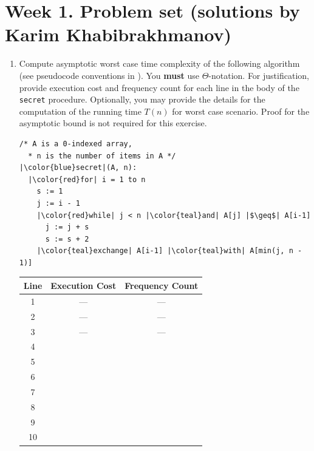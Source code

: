 \documentclass[dvipsnames]{article}
\begin{document}
\section*{Week 1. Problem set (solutions by Karim Khabibrakhmanov)}

\thispagestyle{fancy}

\begin{enumerate}
  \item
    Compute asymptotic worst case time complexity of the following algorithm (see pseudocode conventions in \cite[\S 2.1]{Cormen2022}).
    You \textbf{must} use $\Theta$-notation.
    For justification, provide execution cost and frequency count for each line in the body of the \texttt{secret} procedure.
    Optionally, you may provide the details for the computation of the running time $T(n)$ for worst case scenario.
    Proof for the asymptotic bound is not required for this exercise.

    \begin{minipage}{0.55\textwidth}
      \begin{verbatim}
/* A is a 0-indexed array,
  * n is the number of items in A */
|\color{blue}secret|(A, n):
  |\color{red}for| i = 1 to n
    s := 1
    j := i - 1
    |\color{red}while| j < n |\color{teal}and| A[j] |$\geq$| A[i-1]
      j := j + s
      s := s + 2
    |\color{teal}exchange| A[i-1] |\color{teal}with| A[min(j, n - 1)]
      \end{verbatim}
    \end{minipage}%
    \begin{minipage}{0.4\textwidth}
      \small
      \begin{tabular}{ c | c | c }
      Line & Execution Cost & Frequency Count \\ 
      \hline
      1 & --- & --- \\  
      2 & --- & --- \\
      3 & --- & --- \\
      4 &     &  \\
      5 &     &  \\
      6 &     &  \\
      7 &     &  \\
      8 &     &  \\
      9 &     &  \\
      10 &    &  \\
      \end{tabular}
    \end{minipage}


\end{enumerate}
\end{document}
